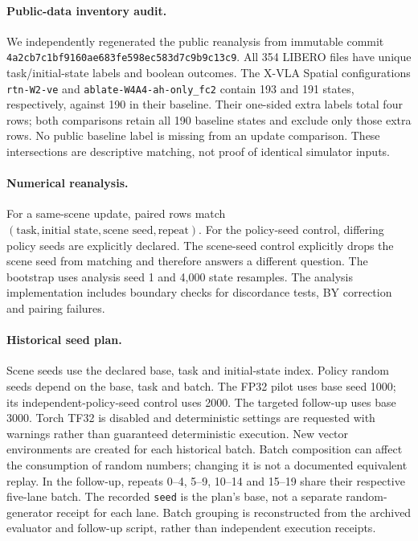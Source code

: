 \documentclass{article}
\begin{document}
\paragraph{Public-data inventory audit.}
We independently regenerated the public reanalysis from immutable commit
\texttt{4a2cb7c1bf9160ae683fe598ec583d7c9b9c13c9}.
All 354 LIBERO files have unique task/initial-state labels and boolean outcomes.
The X-VLA Spatial configurations \texttt{rtn-W2-ve} and
\texttt{ablate-W4A4-ah-only\_fc2} contain 193 and 191 states, respectively,
against 190 in their baseline. Their one-sided extra labels total four rows;
both comparisons retain all 190 baseline states and exclude only those extra rows.
No public baseline label is missing from an update comparison. These intersections
are descriptive matching, not proof of identical simulator inputs.

\paragraph{Numerical reanalysis.}
For a same-scene update, paired rows match
$(\text{task},\text{initial state},\text{scene seed},\text{repeat})$.
For the policy-seed control, differing policy seeds are explicitly declared.
The scene-seed control explicitly drops the scene seed from matching and therefore
answers a different question. The bootstrap uses analysis seed 1 and 4,000 state
resamples. The analysis implementation includes boundary checks for discordance
tests, BY correction and pairing failures.

\paragraph{Historical seed plan.}
Scene seeds use the declared base, task and initial-state index. Policy random seeds
depend on the base, task and batch. The FP32 pilot uses base seed 1000; its
independent-policy-seed control uses 2000. The targeted follow-up uses base 3000.
Torch TF32 is disabled and deterministic settings are requested with warnings
rather than guaranteed deterministic execution. New vector environments are created
for each historical batch. Batch composition can affect the consumption of random
numbers; changing it is not a documented equivalent replay.
In the follow-up, repeats 0--4, 5--9, 10--14 and 15--19 share their respective
five-lane batch. The recorded \texttt{seed} is the plan's base, not a separate
random-generator receipt for each lane. Batch grouping is reconstructed from the
archived evaluator and follow-up script, rather than independent execution receipts.
\end{document}
